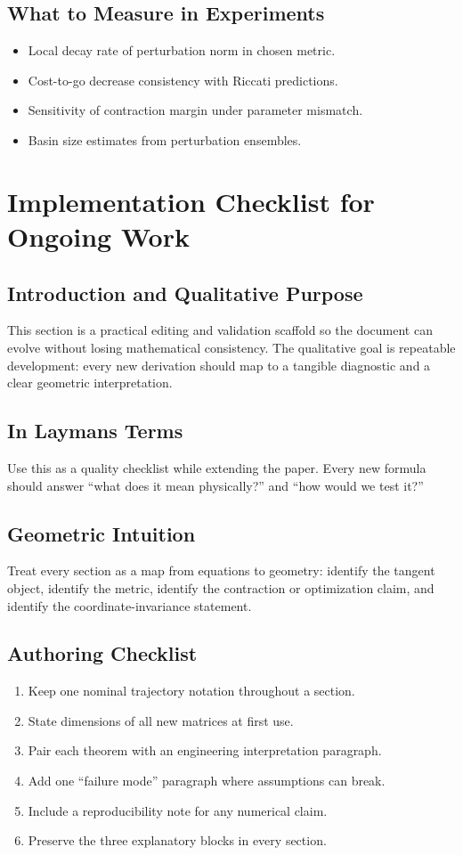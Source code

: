 \documentclass[11pt,letterpaper]{article}
\begin{document}
\subsection{What to Measure in Experiments}
\begin{itemize}
\item Local decay rate of perturbation norm in chosen metric.
\item Cost-to-go decrease consistency with Riccati predictions.
\item Sensitivity of contraction margin under parameter mismatch.
\item Basin size estimates from perturbation ensembles.
\end{itemize}

\section{Implementation Checklist for Ongoing Work}

\subsection{Introduction and Qualitative Purpose}
This section is a practical editing and validation scaffold so the document can evolve without losing mathematical consistency. The qualitative goal is repeatable development: every new derivation should map to a tangible diagnostic and a clear geometric interpretation.

\subsection{In Laymans Terms}
Use this as a quality checklist while extending the paper. Every new formula should answer ``what does it mean physically?'' and ``how would we test it?''

\subsection{Geometric Intuition}
Treat every section as a map from equations to geometry: identify the tangent object, identify the metric, identify the contraction or optimization claim, and identify the coordinate-invariance statement.

\subsection{Authoring Checklist}
\begin{enumerate}[label=\arabic*.]
\item Keep one nominal trajectory notation throughout a section.
\item State dimensions of all new matrices at first use.
\item Pair each theorem with an engineering interpretation paragraph.
\item Add one ``failure mode'' paragraph where assumptions can break.
\item Include a reproducibility note for any numerical claim.
\item Preserve the three explanatory blocks in every section.
\end{enumerate}
\end{document}
